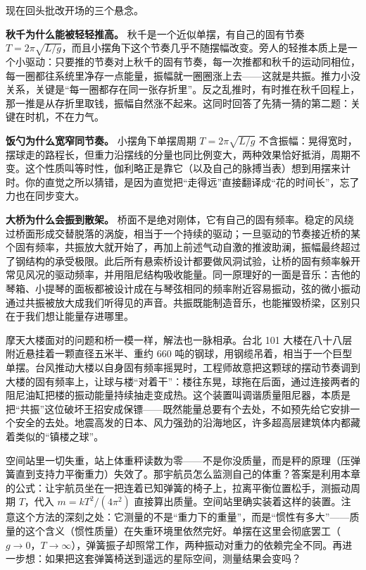 现在回头批改开场的三个悬念。

\textbf{秋千为什么能被轻轻推高。} 秋千是一个近似单摆，有自己的固有节奏 \(T=2\pi\sqrt{L/g}\)，而且小摆角下这个节奏几乎不随摆幅改变。旁人的轻推本质上是一个小驱动：只要推的节奏对上秋千的固有节奏，每一次推都和秋千的运动同相位，每一圈都往系统里净存一点能量，振幅就一圈圈涨上去——这就是共振。推力小没关系，关键是“每一圈都存在同一张存折里”。反之乱推时，有时推在秋千回程上，那一推是从存折里取钱，振幅自然涨不起来。这同时回答了先猜一猜的第二题：关键在时机，不在力气。

\textbf{饭勺为什么宽窄同节奏。} 小摆角下单摆周期 \(T=2\pi\sqrt{L/g}\) 不含振幅：晃得宽时，摆球走的路程长，但重力沿摆线的分量也同比例变大，两种效果恰好抵消，周期不变。这个性质叫等时性，伽利略正是靠它（以及自己的脉搏当表）想到用摆来计时。你的直觉之所以猜错，是因为直觉把“走得远”直接翻译成“花的时间长”，忘了力也在同步变大。

\textbf{大桥为什么会振到散架。} 桥面不是绝对刚体，它有自己的固有频率。稳定的风绕过桥面形成交替脱落的涡旋，相当于一个持续的驱动；一旦驱动的节奏接近桥的某个固有频率，共振放大就开始了，再加上前述气动自激的推波助澜，振幅最终超过了钢结构的承受极限。此后所有悬索桥设计都要做风洞试验，让桥的固有频率躲开常见风况的驱动频率，并用阻尼结构吸收能量。同一原理好的一面是音乐：吉他的琴箱、小提琴的面板都被设计成在与琴弦相同的频率附近容易振动，弦的微小振动通过共振被放大成我们听得见的声音。共振既能制造音乐，也能摧毁桥梁，区别只在于我们想让能量存进哪里。

摩天大楼面对的问题和桥一模一样，解法也一脉相承。台北 101 大楼在八十八层附近悬挂着一颗直径五米半、重约 660 吨的钢球，用钢缆吊着，相当于一个巨型单摆。台风推动大楼以自身固有频率摇晃时，工程师故意把这颗球的摆动节奏调到大楼的固有频率上，让球与楼“对着干”：楼往东晃，球拖在后面，通过连接两者的阻尼油缸把楼的振动能量持续抽走变成热。这个装置叫调谐质量阻尼器，本质是把“共振”这位破坏王招安成保镖——既然能量总要有个去处，不如预先给它安排一个安全的去处。地震高发的日本、风力强劲的沿海地区，许多超高层建筑体内都藏着类似的“镇楼之球”。


\begin{thought}[在空间站里称体重]
空间站里一切失重，站上体重秤读数为零——不是你没质量，而是秤的原理（压弹簧直到支持力平衡重力）失效了。那宇航员怎么监测自己的体重？答案是利用本章的公式：让宇航员坐在一把连着已知弹簧的椅子上，拉离平衡位置松手，测振动周期 \(T\)，代入 \(m=kT^{2}/(4\pi^{2})\) 直接算出质量。空间站里确实装着这样的装置。注意这个方法的深刻之处：它测量的不是“重力下的重量”，而是“惯性有多大”——质量的这个含义（惯性质量）在失重环境里依然完好。单摆在这里会彻底罢工（\(g\to0\)，\(T\to\infty\)），弹簧振子却照常工作，两种振动对重力的依赖完全不同。再进一步想：如果把这套弹簧椅送到遥远的星际空间，测量结果会变吗？
\end{thought}

